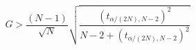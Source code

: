 \documentclass[12pt]{article}
\begin{document}
\pagestyle{empty}
\Large
{}
\pagecolor{ehandbook}





\[
G > \frac{(N-1)} {\sqrt{N}} \sqrt{\frac{(t_{\alpha/(2N),N-2})^2} {N-2+(t_{\alpha/(2N),N-2})^2}}
\]

  
 
\end{document}
